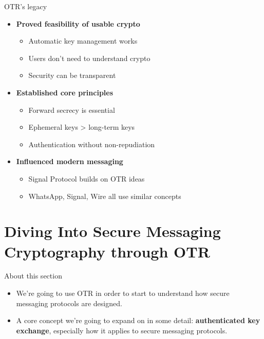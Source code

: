 \documentclass[aspectratio=169, lualatex, handout]{beamer}
\begin{document}
\begin{frame}{OTR's legacy}
	\begin{itemize}
		\item \textbf{Proved feasibility of usable crypto}
		      \begin{itemize}
			      \item Automatic key management works
			      \item Users don't need to understand crypto
			      \item Security can be transparent
		      \end{itemize}
		\item \textbf{Established core principles}
		      \begin{itemize}
			      \item Forward secrecy is essential
			      \item Ephemeral keys > long-term keys
			      \item Authentication without non-repudiation
		      \end{itemize}
		\item \textbf{Influenced modern messaging}
		      \begin{itemize}
			      \item Signal Protocol builds on OTR ideas
			      \item WhatsApp, Signal, Wire all use similar concepts
		      \end{itemize}
	\end{itemize}
\end{frame}

\section{Diving Into Secure Messaging Cryptography through OTR}

\begin{frame}{About this section}
	\begin{itemize}
		\item We're going to use OTR in order to start to understand how secure messaging protocols are designed.
		\item A core concept we're going to expand on in some detail: \textbf{authenticated key exchange}, especially how it applies to secure messaging protocols.
	\end{itemize}
\end{frame}
\end{document}
